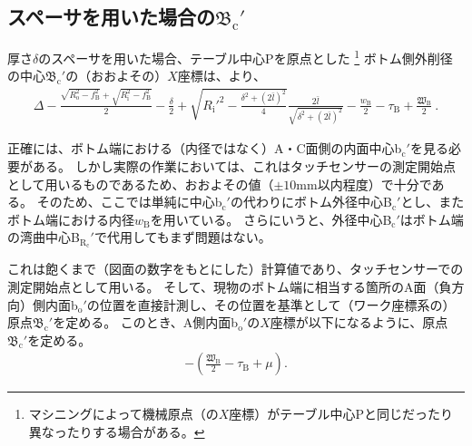 \subsection[スペーサを用いた場合の\texorpdfstring{$\mathfrak B_\mathrm c'$}{Bc'}]
           {スペーサを用いた場合の$\boldsymbol{\mathfrak B_\mathrm c'}$}
厚さ$\delta$のスペーサを用いた場合、テーブル中心Pを原点とした
\footnote{マシニングによって機械原点（の$X$座標）がテーブル中心Pと同じだったり異なったりする場合がある。}\relax
ボトム側外削径の中心$\mathfrak B_\mathrm c'$の（おおよその）$X$座標は、より、
\begin{align*}
  \varDelta-\frac{\sqrt{R_\mathrm o^2-f_\mathrm B^2}+\sqrt{R_\mathrm i^2-f_\mathrm B^2}}2-\frac\delta2
  +\sqrt{R_\mathrm i'^2-\frac{\delta^2+(2\bar l)^2}4}\frac{2\bar l}{\sqrt{\delta^2+(2\bar l)^2}}
  -\frac{w_\mathrm B}2-\tau_\mathrm B+\frac{\mathfrak W_\mathrm B}2\ .
\end{align*}
\begin{hosoku}
正確には、ボトム端における（内径ではなく）A・C面側の内面中心b$_\mathrm c'$を見る必要がある。
しかし実際の作業においては、これはタッチセンサーの測定開始点として用いるものであるため、おおよその値（$\pm10$mm以内程度）で十分である。
そのため、ここでは単純に中心b$_\mathrm c'$の代わりにボトム外径中心B$_\mathrm c'$とし、またボトム端における内径$w_\mathrm B$を用いている。
さらにいうと、外径中心B$_\mathrm c'$はボトム端の湾曲中心B$_{\mathrm R_\mathrm c}'$で代用してもまず問題はない。
\end{hosoku}
これは飽くまで（図面の数字をもとにした）計算値であり、タッチセンサーでの測定開始点として用いる。
そして、現物のボトム端に相当する箇所のA面（負方向）側内面b$_\mathrm o'$の位置を直接計測し、その位置を基準として（ワーク座標系の）原点$\mathfrak B_\mathrm c'$を定める。
このとき、A側内面b$_\mathrm o'$の$X$座標が以下になるように、原点$\mathfrak B_\mathrm c'$を定める。
\begin{align*}
  -\left(\frac{\mathfrak W_\mathrm B}2-\tau_\mathrm B+\mu\right).
\end{align*}


